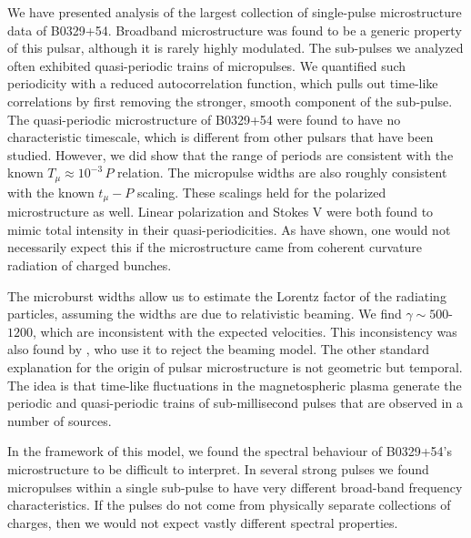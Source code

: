 We have presented analysis of the largest collection 
of single-pulse microstructure data of 
B0329+54. Broadband microstructure was found to be a 
generic property of this pulsar, although it is
rarely highly modulated. The sub-pulses we analyzed often 
exhibited quasi-periodic trains of micropulses. We 
quantified such periodicity with a reduced autocorrelation 
function, which pulls out time-like correlations by 
first removing the stronger, smooth component of the 
sub-pulse. The quasi-periodic microstructure of B0329+54
were found to have no characteristic timescale, which is
different from other pulsars that have been studied. 
However, we did show that the range of periods are 
consistent with the known $T_\mu \approx 10^{-3}\,P$ relation. 
The micropulse widths are also roughly consistent with 
the known $t_\mu-P$ scaling. These scalings held for 
the polarized microstructure as well. Linear polarization 
and Stokes V were both found to mimic total intensity in 
their quasi-periodicities. As \citet{2015ApJ...806..236M} 
have shown, one would not necessarily expect this 
if the microstructure came from 
coherent curvature radiation of charged bunches.

The microburst widths allow us to estimate the Lorentz 
factor of the radiating particles, assuming the widths 
are due to relativistic beaming. We find $\gamma\sim500$-$1200$, 
which are inconsistent with the expected velocities. 
This inconsistency was also found by \citet{1998A&A...332..111L}, 
who use it to reject the beaming model. The other standard 
explanation for the origin of pulsar microstructure is not 
geometric but temporal. The idea is that time-like 
fluctuations in the magnetospheric plasma generate the 
periodic and quasi-periodic trains of sub-millisecond pulses
that are observed in a number of sources. 

In the framework of this model, we found the spectral 
behaviour of B0329+54's microstructure to be difficult
to interpret. In several strong pulses we found 
micropulses within a single sub-pulse to have very different 
broad-band frequency characteristics. If the pulses 
do not come from physically separate collections of 
charges, then we would not expect vastly different 
spectral properties. 

